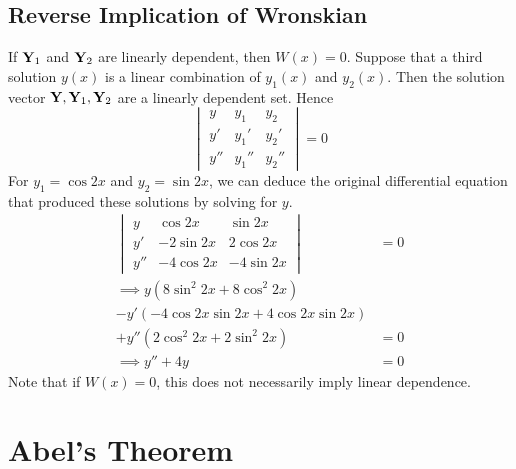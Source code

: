 \documentclass{article}
\begin{document}
\subsection{Reverse Implication of Wronskian}
If $\vb Y_1$ and $\vb Y_2$ are linearly dependent, then $W(x) = 0$. Suppose that a third solution $y(x)$ is a linear combination of $y_1(x)$ and $y_2(x)$. Then the solution vector $\vb Y, \vb Y_1, \vb Y_2$ are a linearly dependent set. Hence
\[
    \begin{vmatrix}
        y   & y_1   & y_2   \\
        y'  & y_1'  & y_2'  \\
        y'' & y_1'' & y_2''
    \end{vmatrix}
    = 0
\]
For $y_1 = \cos 2x$ and $y_2 = \sin 2x$, we can deduce the original differential equation that produced these solutions by solving for $y$.
\begin{align*}
    \begin{vmatrix}
        y   & \cos 2x   & \sin 2x    \\
        y'  & -2\sin 2x & 2 \cos 2x  \\
        y'' & -4\cos 2x & -4 \sin 2x
    \end{vmatrix}          & = 0 \\
    \implies y(8\sin^2 2x + 8\cos^2 2x) &     \\ - y'(-4 \cos 2x \sin 2x + 4 \cos 2x \sin 2x) &\\ + y''(2\cos^2 2x + 2\sin^2 2x) &= 0 \\
    \implies y'' + 4y                   & = 0
\end{align*}
Note that if $W(x) = 0$, this does not necessarily imply linear dependence.

\section{Abel's Theorem}
\end{document}
